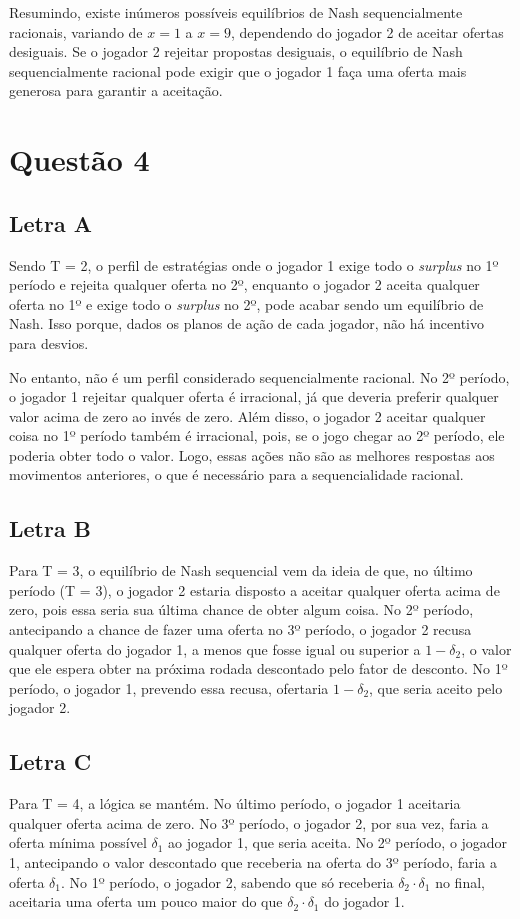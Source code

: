\documentclass[a4paper,12pt]{article}[abntex2]
\begin{document}
Resumindo, existe inúmeros possíveis equilíbrios de Nash sequencialmente racionais, variando de \( x = 1 \) a \( x = 9 \), dependendo do jogador 2 de aceitar ofertas desiguais. Se o jogador 2 rejeitar propostas desiguais, o equilíbrio de Nash sequencialmente racional pode exigir que o jogador 1 faça uma oferta mais generosa para garantir a aceitação.

\section{\textbf{Questão 4}}

\subsection{\textbf{Letra A}}
 Sendo T = 2, o perfil de estratégias onde o jogador 1 exige todo o \textit{surplus} no 1º período e rejeita qualquer oferta no 2º, enquanto o jogador 2 aceita qualquer oferta no 1º e exige todo o \textit{surplus} no 2º, pode acabar sendo um equilíbrio de Nash. Isso porque, dados os planos de ação de cada jogador, não há incentivo para desvios.

No entanto, não é um perfil considerado sequencialmente racional. No 2º período, o jogador 1 rejeitar qualquer oferta é irracional, já que deveria preferir qualquer valor acima de zero ao invés de zero. Além disso, o jogador 2 aceitar qualquer coisa no 1º período também é irracional, pois, se o jogo chegar ao 2º período, ele poderia obter todo o valor. Logo, essas ações não são as melhores respostas aos movimentos anteriores, o que é necessário para a sequencialidade racional.

\subsection{\textbf{Letra B}}
Para T = 3, o equilíbrio de Nash sequencial vem da ideia de que, no último período (T = 3), o jogador 2 estaria disposto a aceitar qualquer oferta acima de zero, pois essa seria sua última chance de obter algum coisa. No 2º período, antecipando a chance de fazer uma oferta no 3º período, o jogador 2 recusa qualquer oferta do jogador 1, a menos que fosse igual ou superior a \( 1 - \delta_2 \), o valor que ele espera obter na próxima rodada descontado pelo fator de desconto. No 1º período, o jogador 1, prevendo essa recusa, ofertaria \( 1 - \delta_2 \), que seria aceito pelo jogador 2.

\subsection{\textbf{Letra C}}
Para T = 4, a lógica se mantém. No último período, o jogador 1 aceitaria qualquer oferta acima de zero. No 3º período, o jogador 2, por sua vez, faria a oferta mínima possível \( \delta_1 \) ao jogador 1, que seria aceita. No 2º período, o jogador 1, antecipando o valor descontado que receberia na oferta do 3º período, faria a oferta \( \delta_1 \). No 1º período, o jogador 2, sabendo que só receberia \( \delta_2 \cdot \delta_1 \) no final, aceitaria uma oferta um pouco maior do que \( \delta_2 \cdot \delta_1 \) do jogador 1.
\end{document}
